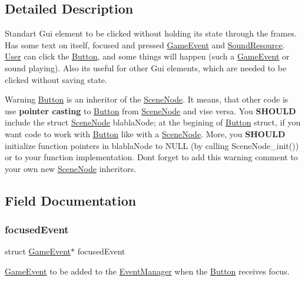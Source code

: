 \subsection{Detailed Description}
Standart Gui element to be clicked without holding it\textquotesingle{}s state through the frames. Has some text on itself, focused and pressed \hyperlink{struct_game_event}{Game\+Event} and \hyperlink{struct_sound_resource}{Sound\+Resource}. \hyperlink{struct_user}{User} can click the \hyperlink{struct_button}{Button}, and some things will happen (such a \hyperlink{struct_game_event}{Game\+Event} or sound playing). Also it\textquotesingle{}s useful for other Gui elements, which are needed to be clicked without saving state. 

\begin{DoxyWarning}{Warning}
\hyperlink{struct_button}{Button} is an inheritor of the \hyperlink{struct_scene_node}{Scene\+Node}. It means, that other code is use {\bfseries pointer casting} to \hyperlink{struct_button}{Button} from \hyperlink{struct_scene_node}{Scene\+Node} and vise versa. You {\bfseries S\+H\+O\+U\+LD} include the {\ttfamily struct \hyperlink{struct_scene_node}{Scene\+Node} blabla\+Node;} at the begining of \hyperlink{struct_button}{Button} struct, if you want code to work with \hyperlink{struct_button}{Button} like with a \hyperlink{struct_scene_node}{Scene\+Node}. More, you {\bfseries S\+H\+O\+U\+LD} initialize function pointers in {\ttfamily blabla\+Node} to N\+U\+LL (by calling Scene\+Node\+\_\+init()) or to your function implementation. Don\textquotesingle{}t forget to add this warning comment to your own new \hyperlink{struct_scene_node}{Scene\+Node} inheritors. 
\end{DoxyWarning}


\subsection{Field Documentation}
\hypertarget{struct_button_af8909553495b609dc7c9efd469ffc31d}{}\label{struct_button_af8909553495b609dc7c9efd469ffc31d} 
\subsubsection{\texorpdfstring{focused\+Event}{focusedEvent}}
{\footnotesize\ttfamily struct \hyperlink{struct_game_event}{Game\+Event}$\ast$ focused\+Event}

\hyperlink{struct_game_event}{Game\+Event} to be added to the \hyperlink{struct_event_manager}{Event\+Manager} when the \hyperlink{struct_button}{Button} receives focus. \hypertarget{struct_button_aff7dcf845e86b8d62077ceec6094f3e3}{}\label{struct_button_aff7dcf845e86b8d62077ceec6094f3e3} 
